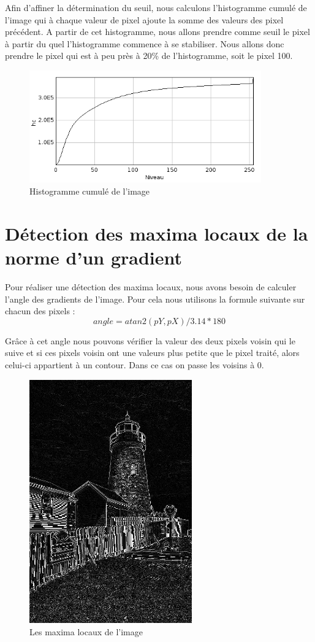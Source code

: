 \documentclass[a4paper,11pt]{article}
\begin{document}
  Afin d'affiner la détermination du seuil, nous calculons l'histogramme cumulé de l'image qui à chaque valeur
  de pixel ajoute la somme des valeurs des pixel précédent. A partir de cet histogramme, nous allons prendre
  comme seuil le pixel à partir du quel l'histogramme commence à se stabiliser. Nous allons donc prendre le pixel
  qui est à peu près à 20\% de l'histogramme, soit le pixel 100.
  
  \begin{figure}[H]
  \center
   \includegraphics[width=10cm]{../histoCumul.png}
   \caption{Histogramme cumulé de l'image}
  \end{figure}
  
  \section{Détection des maxima locaux de la norme d'un gradient}
  Pour réaliser une détection des maxima locaux, nous avons besoin de calculer l'angle des gradients
  de l'image. Pour cela nous utilisons la formule suivante sur chacun des pixels : \\
  $$angle = atan2(pY, pX)/3.14*180$$
  
  Grâce à cet angle nous pouvons vérifier la valeur des deux pixels voisin qui le suive et si ces pixels
  voisin ont une valeurs plus petite que le pixel traité, alors celui-ci appartient à un contour.
  Dans ce cas on passe les voisins à 0.\\
  
  \begin{figure}[H]
  \center
   \includegraphics[width=7cm]{../maxima_locaux.png}
   \caption{Les maxima locaux de l'image}
  \end{figure}
  
\end{document}
